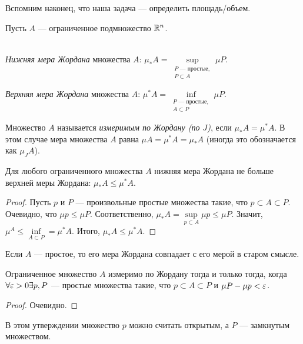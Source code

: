 Вспомним наконец, что наша задача --- определить площадь/объем.

Пусть $A$ --- ограниченное подмножество $\mathbb{R}^n$.

\begin{Def}\ \\
\textit{Нижняя мера Жордана} множества $A$: $\mu_*A = \sup\limits_{\substack{P \text{ --- простые},\\ P \subset A}} \mu P$.

\textit{Верхняя мера Жордана} множества $A$: $\mu^*A = \inf\limits_{\substack{P \text{ --- простые},\\ A \subset P}} \mu P$.
\end{Def}

\begin{Def}
Множество $A$ называется \textit{измеримым по Жордану (по $J$)}, если $\mu_*A = \mu^*A$. В этом случае мера множества $A$ равна $\mu A = \mu^*A=\mu_*A$ (иногда это обозначается как $\mu_J A$).
\end{Def}

\begin{Statement}
Для любого ограниченного множества $A$ нижняя мера Жордана не больше верхней меры Жордана: $\mu_*A \leq \mu^*A$.
\end{Statement}
\begin{proof}
Пусть $p$ и $P$ --- произвольные простые множества такие, что $p \subset A \subset P$. Очевидно, что $\mu p \leq \mu P$. Соответственно, $\mu_* A = \sup\limits_{p \subset A} \mu p \leq \mu P$. Значит, $\mu^A \leq \inf\limits_{A \subset P} = \mu^* A$. Итого, $\mu_* A \leq \mu^* A$.
\end{proof}

\begin{Statement}
Если $A$ --- простое, то его мера Жордана совпадает с его мерой в старом смысле.
\end{Statement}

\begin{Statement}
Ограниченное множество $A$ измеримо по Жордану тогда и только тогда, когда $\forall \varepsilon > 0 \exists p, P$ --- простые множества такие, что $p \subset A \subset P$ и $\mu P - \mu p < \varepsilon$.
\end{Statement}
\begin{proof}
Очевидно.
\end{proof}

\begin{Comment}
В этом утверждении множество $p$ можно считать открытым, а $P$ --- замкнутым множеством.
\end{Comment}

